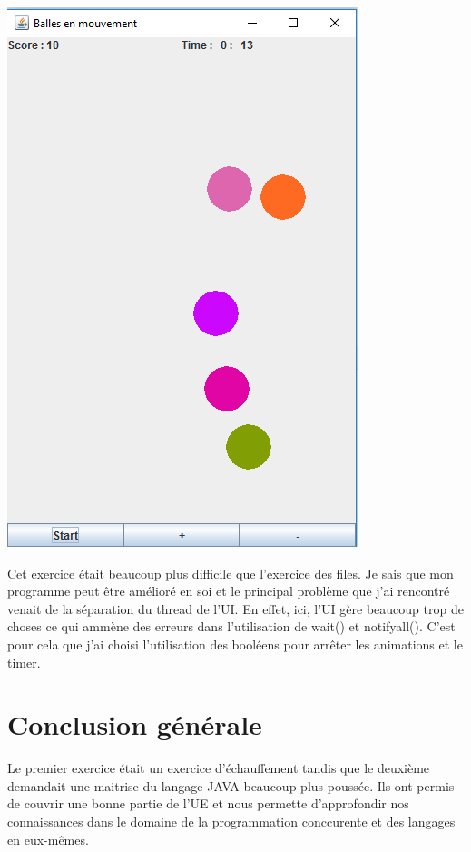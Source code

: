 \documentclass{article}
\begin{document}
\begin{enumerate}
\begin{center}
  \includegraphics[scale=0.75]{Ballesmvt.png}
\end{center}

Cet exercice était beaucoup plus difficile que l'exercice des files. Je sais que mon programme peut être amélioré en soi et le principal problème que j'ai rencontré venait de la séparation du thread de l'UI. En effet, ici, l'UI gère beaucoup trop de choses ce qui ammène des erreurs dans l'utilisation de wait() et notifyall(). C'est pour cela que j'ai choisi l'utilisation des booléens pour arrêter les animations et le timer. 
\end{enumerate}

\section{Conclusion générale}

Le premier exercice était un exercice d'échauffement tandis que le deuxième demandait une maitrise du langage JAVA beaucoup plus poussée. Ils ont permis de couvrir une bonne partie de l'UE et nous permette d'approfondir nos connaissances dans le domaine de la programmation conccurente et des langages en eux-mêmes.





\end{document}
